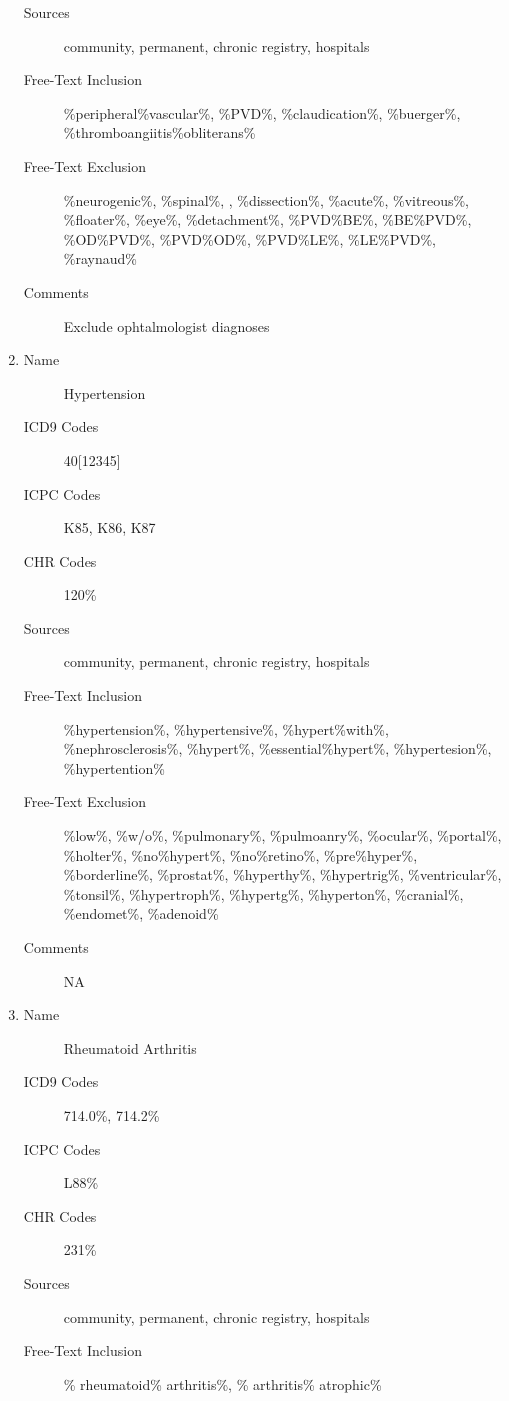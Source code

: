 \documentclass[a4paper,12pt]{article}
\begin{document}
\begin{appendices}
\begin{enumerate}
\begin{description}
   						\item[Sources] community, permanent, chronic registry, hospitals
   						\item[Free-Text Inclusion] \%peripheral\%vascular\%, \%PVD\%, \%claudication\%, \%buerger\%, \%thromboangiitis\%obliterans\%
   						\item[Free-Text Exclusion] \%neurogenic\%, \%spinal\%, , \%dissection\%, \%acute\%, \%vitreous\%, \%floater\%, \%eye\%, \%detachment\%, \%PVD\%BE\%, \%BE\%PVD\%, \%OD\%PVD\%, \%PVD\%OD\%, \%PVD\%LE\%, \%LE\%PVD\%, \%raynaud\%
   						\item[Comments] Exclude ophtalmologist diagnoses
   					\end{description}
   					\item
   					\begin{description}
   						\item[Name] Hypertension
   						\item[ICD9 Codes] 40[12345]
   						\item[ICPC Codes] K85, K86, K87
   						\item[CHR Codes] 120\%
   						\item[Sources] community, permanent, chronic registry, hospitals
   						\item[Free-Text Inclusion] \%hypertension\%, \%hypertensive\%, \%hypert\%with\%, \%nephrosclerosis\%, \%hypert\%, \%essential\%hypert\%, \%hypertesion\%, \%hypertention\%
   						\item[Free-Text Exclusion] \%low\%, \%w/o\%, \%pulmonary\%, \%pulmoanry\%, \%ocular\%, \%portal\%, \%holter\%, \%no\%hypert\%, \%no\%retino\%, \%pre\%hyper\%, \%borderline\%, \%prostat\%, \%hyperthy\%, \%hypertrig\%, \%ventricular\%, \%tonsil\%, \%hypertroph\%, \%hypertg\%, \%hyperton\%, \%cranial\%, \%endomet\%, \%adenoid\%
   						\item[Comments] NA
   					\end{description}
   					\item
   					\begin{description}
   						\item[Name] Rheumatoid Arthritis
   						\item[ICD9 Codes] 714.0\%, 714.2\%
   						\item[ICPC Codes] L88\%
   						\item[CHR Codes] 231\%
   						\item[Sources] community, permanent, chronic registry, hospitals
   						\item[Free-Text Inclusion] \% rheumatoid\% arthritis\%, \% arthritis\% atrophic\%

\end{description}
\end{enumerate}
\end{appendices}
\end{document}
